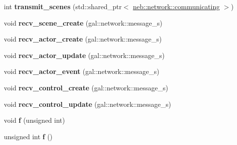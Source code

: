 \begin{DoxyCompactItemize}
\item 
\hypertarget{classneb_1_1app_a0ae9f3e3853e68b57b8ab76961151e7d}{int {\bfseries transmit\-\_\-scenes} (std\-::shared\-\_\-ptr$<$ \hyperlink{classneb_1_1network_1_1communicating}{neb\-::network\-::communicating} $>$)}\label{classneb_1_1app_a0ae9f3e3853e68b57b8ab76961151e7d}

\item 
\hypertarget{classneb_1_1app_a7a65b1cb131fba86458aa24964ad5170}{void {\bfseries recv\-\_\-scene\-\_\-create} (gal\-::network\-::message\-\_\-s)}\label{classneb_1_1app_a7a65b1cb131fba86458aa24964ad5170}

\item 
\hypertarget{classneb_1_1app_aa611d54b259485a21407eae7f71c9fde}{void {\bfseries recv\-\_\-actor\-\_\-create} (gal\-::network\-::message\-\_\-s)}\label{classneb_1_1app_aa611d54b259485a21407eae7f71c9fde}

\item 
\hypertarget{classneb_1_1app_adbaa519543d2e061c269b216b5c72ada}{void {\bfseries recv\-\_\-actor\-\_\-update} (gal\-::network\-::message\-\_\-s)}\label{classneb_1_1app_adbaa519543d2e061c269b216b5c72ada}

\item 
\hypertarget{classneb_1_1app_ad449a2212662a30fcc02f4677e535b77}{void {\bfseries recv\-\_\-actor\-\_\-event} (gal\-::network\-::message\-\_\-s)}\label{classneb_1_1app_ad449a2212662a30fcc02f4677e535b77}

\item 
\hypertarget{classneb_1_1app_aa4856f8e8eb8ccd5914689d6451f64e4}{void {\bfseries recv\-\_\-control\-\_\-create} (gal\-::network\-::message\-\_\-s)}\label{classneb_1_1app_aa4856f8e8eb8ccd5914689d6451f64e4}

\item 
\hypertarget{classneb_1_1app_a7e6cb986c8b71ed1a2e2b5116ea4d54d}{void {\bfseries recv\-\_\-control\-\_\-update} (gal\-::network\-::message\-\_\-s)}\label{classneb_1_1app_a7e6cb986c8b71ed1a2e2b5116ea4d54d}

\item 
\hypertarget{classneb_1_1app_a878745ce448b6a32639f9b28c91d3dac}{void {\bfseries f} (unsigned int)}\label{classneb_1_1app_a878745ce448b6a32639f9b28c91d3dac}

\item 
\hypertarget{classneb_1_1app_a4158adddede1a017c151da072503dcad}{unsigned int {\bfseries f} ()}\label{classneb_1_1app_a4158adddede1a017c151da072503dcad}

\end{DoxyCompactItemize}
